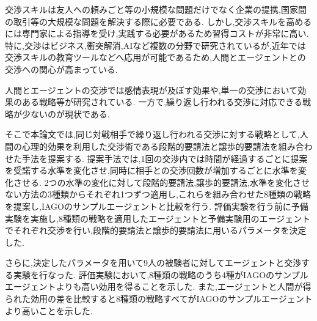 
交渉スキルは友人への頼みごと等の小規模な問題だけでなく企業の提携,国家間の取引等の大規模な問題を解決する際に必要である.
しかし,交渉スキルを高めるには専門家による指導を受け,実践する必要があるため習得コストが非常に高い.
特に,交渉はビジネス,衝突解消,AIなど複数の分野で研究されているが,近年では交渉スキルの教育ツールなどへ応用が可能であるため,人間とエージェントとの交渉への関心が高まっている.

人間とエージェントの交渉では感情表現が及ぼす効果や,単一の交渉において効果のある戦略等が研究されている.
一方で,繰り返し行われる交渉に対応できる戦略が少ないのが現状である.

そこで本論文では,同じ対戦相手で繰り返し行われる交渉に対する戦略として,人間の心理的効果を利用した交渉術である段階的要請法と譲歩的要請法を組み合わせた手法を提案する.
提案手法では,1回の交渉内では時間が経過するごとに提案を受諾する水準を変化させ,同時に相手との交渉回数が増加するごとに水準を変化させる.
2つの水準の変化に対して段階的要請法,譲歩的要請法,水準を変化させない方法の3種類からそれぞれ1つずつ適用し,これらを組み合わせた8種類の戦略を提案し,IAGOのサンプルエージェントと比較を行う.
評価実験を行う前に予備実験を実施し,8種類の戦略を適用したエージェントと予備実験用のエージェントでそれぞれ交渉を行い,段階的要請法と譲歩的要請法に用いるパラメータを決定した.

さらに,決定したパラメータを用いて9人の被験者に対してエージェントと交渉する実験を行なった.
評価実験において,8種類の戦略のうち4種がIAGOのサンプルエージェントよりも高い効用を得ることを示した.
また,エージェントと人間が得られた効用の差を比較すると8種類の戦略すべてがIAGOのサンプルエージェントより高いことを示した.
